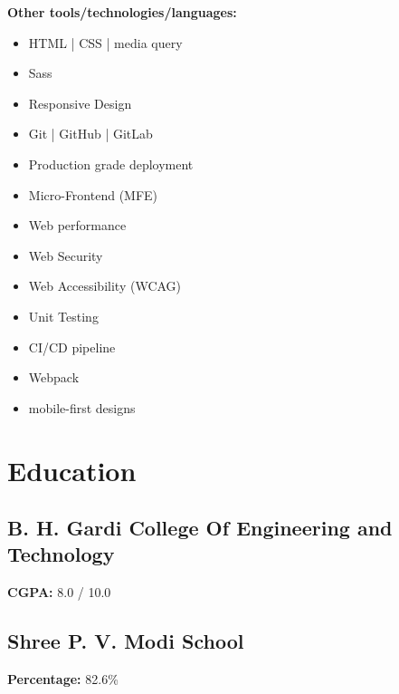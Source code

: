 \documentclass[letterpaper]{deedy-resume} %
\begin{document}
\begin{minipage}[t]{0.33\textwidth}
\vspace{-\topsep}

\textbf{Other tools/technologies/languages:}
\vspace{-\topsep}
\begin{itemize}
    \setlength\itemsep{-0.5em} %
    \item HTML | CSS | media query
    \item Sass %
    \item Responsive Design
    \item Git | GitHub | GitLab
    \item Production grade deployment
    \item Micro-Frontend (MFE)
    \item Web performance
    \item Web Security
    \item Web Accessibility (WCAG)
    \item Unit Testing
    \item CI/CD pipeline
    \item Webpack
    \item mobile-first designs
\end{itemize}

\sectionspace %


\section{Education} 

\subsection{B. H. Gardi College Of Engineering and Technology}
\textbf{CGPA:} 8.0 / 10.0

\sectionspace %




\subsection{Shree P. V. Modi School}
\textbf{Percentage:} 82.6\%


\end{minipage}
\end{document}
